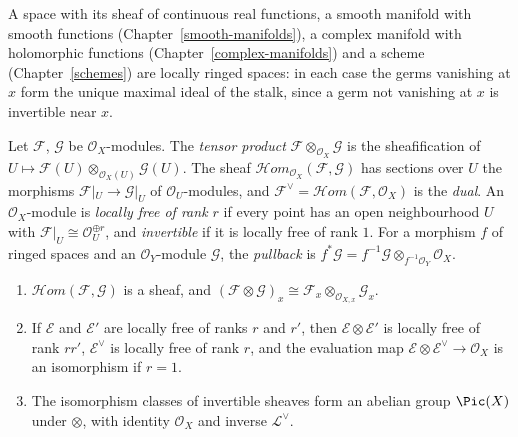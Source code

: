 \begin{example}\label{sheaves:example-ringed-spaces}
A space with its sheaf of continuous real functions, a smooth manifold with smooth functions (Chapter~\ref{smooth-manifolds}), a complex manifold with holomorphic functions
(Chapter~\ref{complex-manifolds}) and a scheme (Chapter~\ref{schemes}) are locally ringed spaces: in each case the germs vanishing at $x$ form the unique maximal ideal of the stalk, since a
germ not vanishing at $x$ is invertible near $x$.
\end{example}

\begin{definition}\label{sheaves:definition-module-operations}
Let $\mathcal{F}$, $\mathcal{G}$ be $\mathcal{O}_X$-modules. The \emph{tensor product} $\mathcal{F} \otimes_{\mathcal{O}_X} \mathcal{G}$ is the sheafification of
$U \mapsto \mathcal{F}(U) \otimes_{\mathcal{O}_X(U)} \mathcal{G}(U)$. The sheaf $\mathcal{H}om_{\mathcal{O}_X}(\mathcal{F}, \mathcal{G})$ has sections over $U$ the morphisms
$\mathcal{F}|_U \to \mathcal{G}|_U$ of $\mathcal{O}_U$-modules, and $\mathcal{F}^\vee = \mathcal{H}om(\mathcal{F}, \mathcal{O}_X)$ is the \emph{dual}. An $\mathcal{O}_X$-module is
\emph{locally free of rank $r$} if every point has an open neighbourhood $U$ with $\mathcal{F}|_U \cong \mathcal{O}_U^{\oplus r}$, and \emph{invertible} if it is locally free of rank $1$.
For a morphism $f$ of ringed spaces and an $\mathcal{O}_Y$-module $\mathcal{G}$, the \emph{pullback} is $f^*\mathcal{G} = f^{-1}\mathcal{G} \otimes_{f^{-1}\mathcal{O}_Y} \mathcal{O}_X$.
\end{definition}

\begin{proposition}\label{sheaves:proposition-modules}
\begin{enumerate}
\item $\mathcal{H}om(\mathcal{F}, \mathcal{G})$ is a sheaf, and $(\mathcal{F} \otimes \mathcal{G})_x \cong \mathcal{F}_x \otimes_{\mathcal{O}_{X,x}} \mathcal{G}_x$.
\item If $\mathcal{E}$ and $\mathcal{E}'$ are locally free of ranks $r$ and $r'$, then $\mathcal{E} \otimes \mathcal{E}'$ is locally free of rank $rr'$, $\mathcal{E}^\vee$ is locally free of rank
$r$, and the evaluation map $\mathcal{E} \otimes \mathcal{E}^\vee \to \mathcal{O}_X$ is an isomorphism if $r = 1$.
\item The isomorphism classes of invertible sheaves form an abelian group $\Pic(X)$ under $\otimes$, with identity $\mathcal{O}_X$ and inverse $\mathcal{L}^\vee$.
\end{enumerate}
\end{proposition}

